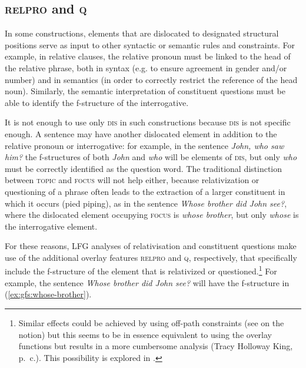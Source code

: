 \documentclass[output=paper]{../langscibook}
\begin{document}
 \subsection{\textsc{relpro} and \textsc{q}\label{sect:gfs:relpro}}
 
 In some constructions, elements that are dislocated to designated structural positions serve as input to other syntactic or semantic rules and constraints. For example, in relative clauses, the relative pronoun must be linked to the head of the relative phrase, both in syntax (e.g. to ensure agreement in gender and/or number) and in semantics (in order to correctly restrict the reference of the head noun). Similarly, the semantic interpretation of constituent questions must be able to identify the f-structure of the interrogative.
 
 It is not enough to use only \textsc{dis} in such constructions because \textsc{dis} is not specific enough. A sentence may have another dislocated element in addition to the relative pronoun or interrogative: for example, in the sentence \textit{John, who saw him?} the f-structures of both \textit{John} and \textit{who} will be elements of \textsc{dis}, but only \textit{who} must be correctly identified as the question word. The traditional distinction between \textsc{topic} and \textsc{focus} will not help either, because relativization or questioning of a phrase often leads to the extraction of a larger constituent in which it occurs (pied piping), as in the sentence \textit{Whose brother did John see?}, where the dislocated element occupying \textsc{focus} is \textit{whose brother}, but only \textit{whose} is the interrogative element.
 
 For these reasons, LFG analyses of relativisation and constituent questions make use of the additional overlay features \textsc{relpro} and \textsc{q}, respectively, that specifically include the f-structure of the element that is relativized or questioned.\footnote{Similar effects could be achieved by using off-path constraints (see  on the notion) but this seems to be in essence equivalent to using the overlay functions but results in a more cumbersome analysis (Tracy Holloway King, p.~c.).  This possibility is explored in .} For example, the sentence \textit{Whose brother did John see?} will have the f-structure in (\ref{ex:gfs:whose-brother}).
 
\end{document}
